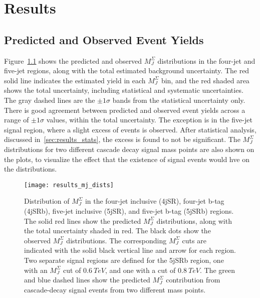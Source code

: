 \chapter{Results}\label{ch:results}

\section{Predicted and Observed Event Yields}\label{sec:results_yields}

Figure~\ref{fig:results_mj_dists} shows the predicted and observed $M_J^{\Sigma}$ distributions in the four-jet and five-jet regions, along with the total estimated background uncertainty.
The red solid line indicates the estimated yield in each $M_J^{\Sigma}$ bin, and the red shaded area shows the total uncertainty, including statistical and systematic uncertainties.
The gray dashed lines are the $\pm1\sigma$ bands from the statistical uncertainty only.
There is good agreement between predicted and observed event yields across a range of $\pm1\sigma$ values, within the total uncertainty.
The exception is in the five-jet signal region, where a slight excess of events is observed.
After statistical analysis, discussed in~\ref{sec:results_stats}, the excess is found to not be significant.
The $M_J^{\Sigma}$ distributions for two different cascade decay signal mass points are also shown on the plots, to visualize the effect that the existence of signal events would hve on the distributions.

\begin{figure}[!ht]
    \centering
\texttt{[image: results\_mj\_dists]}
\caption{Distribution of $M_J^{\Sigma}$ in the four-jet inclusive (4jSR), four-jet b-tag (4jSRb), five-jet inclusive
(5jSR), and five-jet b-tag (5jSRb) regions.
The solid red lines show the predicted $M_J^{\Sigma}$ distributions, along with the total uncertainty shaded in red.
The black dots show the observed $M_J^{\Sigma}$ distributions.
The corresponding $M_J^{\Sigma}$ cuts are indicated with the solid black vertical line and arrow for each region.
Two separate signal regions are defined for the 5jSRb region, one with an $M_J^{\Sigma}$ cut of $0.6~TeV$,
and one with a cut of $0.8~TeV$.
The green and blue dashed lines show the predicted $M_J^{\Sigma}$ contribution from cascade-decay signal events
from two different mass points.
}
\label{fig:results_mj_dists}
\end{figure}

